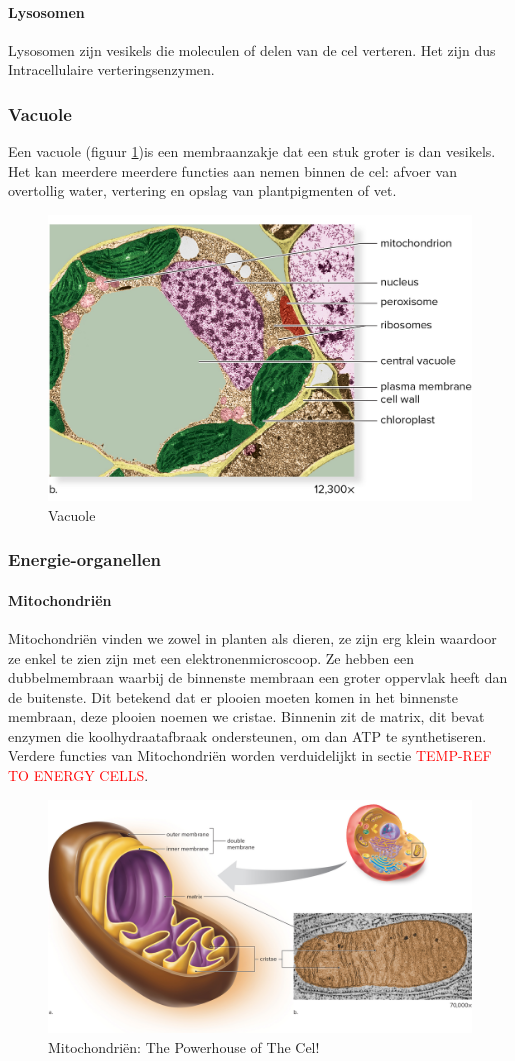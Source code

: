 \documentclass[a4paper,kul]{kulakarticle} %
\begin{document}
\paragraph{Lysosomen}
Lysosomen zijn vesikels die moleculen of delen van de cel verteren. Het zijn dus Intracellulaire verteringsenzymen.
\subsubsection{Vacuole}
Een vacuole (figuur \ref{fig:vacuole})is een membraanzakje dat een stuk groter is dan vesikels. Het kan meerdere meerdere functies aan nemen binnen de cel: afvoer van overtollig water, vertering en opslag van plantpigmenten of vet.
\begin{figure}[!h]
	\centering
	\includegraphics[width=0.5\linewidth]{Vacuole}
	\caption[Vacuole]{Vacuole}
	\label{fig:vacuole}
\end{figure}

\subsubsection{Energie-organellen}
\paragraph{Mitochondriën}
Mitochondriën vinden we zowel in planten als dieren, ze zijn erg klein waardoor ze enkel te zien zijn met een elektronenmicroscoop. Ze hebben een dubbelmembraan waarbij de binnenste membraan een groter oppervlak heeft dan de buitenste. Dit betekend dat er plooien moeten komen in het binnenste membraan, deze plooien noemen we cristae. Binnenin zit de matrix, dit bevat enzymen die koolhydraatafbraak ondersteunen, om dan ATP te synthetiseren. Verdere functies van Mitochondriën worden verduidelijkt in sectie \textcolor{red}{TEMP-REF TO ENERGY CELLS}.
\begin{figure}[h!]
	\centering
	\includegraphics[width=0.7\linewidth]{PowerhouseOfTheCell}
	\caption[Mitochondria]{Mitochondriën: The Powerhouse of The Cel!}
	\label{fig:powerhouseofthecell}
\end{figure}
\newpage
\end{document}
